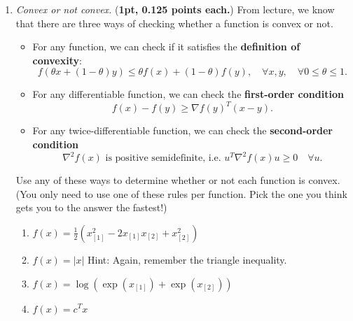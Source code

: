 \documentclass{article}
\newcommand{\idx}[1]{_{[#1]}}
\newcommand{\showpoints}[1]{(\textbf{#1})}
\begin{document}
\begin{enumerate}
\begin{enumerate}
\end{enumerate}



\item  \emph{Convex or not convex.} \showpoints{1pt, 0.125 points each.}
From lecture, we know that there are three ways of checking whether a function is convex or not.
\begin{itemize}
\item For any function, we can check if it satisfies the \textbf{definition of convexity}:
\[
f(\theta x + (1-\theta) y) \leq \theta f(x) + (1-\theta) f(y), \quad \forall x,y, \quad \forall 0\leq \theta \leq 1.
\]
\item For any differentiable function, we can check the \textbf{first-order condition}
\[
f(x)-f(y) \geq \nabla f(y)^T(x-y).
\]
\item For any twice-differentiable function, we can check the \textbf{second-order condition}
\[
\nabla^2 f(x) \text{ is positive semidefinite, i.e. } u^T\nabla^2 f(x) u \geq 0 \quad \forall u.
\]
\end{itemize}
Use any of these ways to determine whether or not each function is convex. (You only need to use one of these rules per function. Pick the one you think gets you to the answer the fastest!)

\begin{enumerate}
\item $f(x) = \frac{1}{2}(x\idx{1}^2-2x\idx{1}x\idx{2}+x\idx{2}^2)$



\item $f(x) = |x|$ Hint: Again, remember the triangle inequality.



 
\item $f(x) = \log(\exp(x\idx{1})+\exp(x\idx{2}))$


\item $f(x) = c^Tx$


\end{enumerate}



\end{enumerate}
\end{document}
